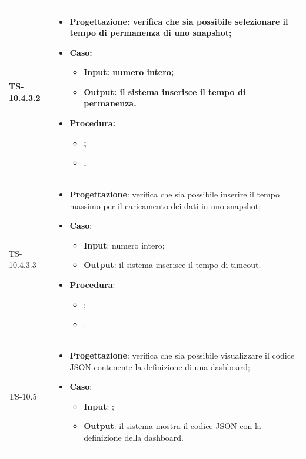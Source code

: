 \begin{longtable}{|C{2.5cm}|C{13cm}|}
	  \\
	\hline
	{TS-10.4.3.2} &
\begin{itemize}
	\item \textbf{Progettazione}: verifica che sia possibile selezionare il
	tempo di permanenza di uno snapshot;
	\item \textbf{Caso}: 
	\begin{itemize}
		\item \textbf{Input}: numero intero;
		\item \textbf{Output}: il sistema inserisce il tempo di permanenza.
	\end{itemize}
	\item \textbf{Procedura}:
	\begin{itemize}
		\item ;
		\item .
	\end{itemize} 
\end{itemize}
	  \\
	\hline
	{TS-10.4.3.3} & 
\begin{itemize}
	\item \textbf{Progettazione}: verifica che sia possibile inserire il tempo
	massimo per il caricamento dei dati in uno snapshot;
	\item \textbf{Caso}: 
	\begin{itemize}
		\item \textbf{Input}: numero intero;
		\item \textbf{Output}: il sistema inserisce il tempo di timeout.
	\end{itemize}
	\item \textbf{Procedura}:
	\begin{itemize}
		\item ;
		\item .
	\end{itemize} 
\end{itemize}
	\\
	\hline
	{TS-10.5} &
\begin{itemize}
	\item \textbf{Progettazione}: verifica che sia possibile visualizzare il
	codice JSON contenente la definizione di una dashboard;
	\item \textbf{Caso}: 
	\begin{itemize}
		\item \textbf{Input}: ;
		\item \textbf{Output}: il sistema mostra il codice JSON con la definizione della dashboard.
	\end{itemize}

\end{itemize}
\end{longtable}
